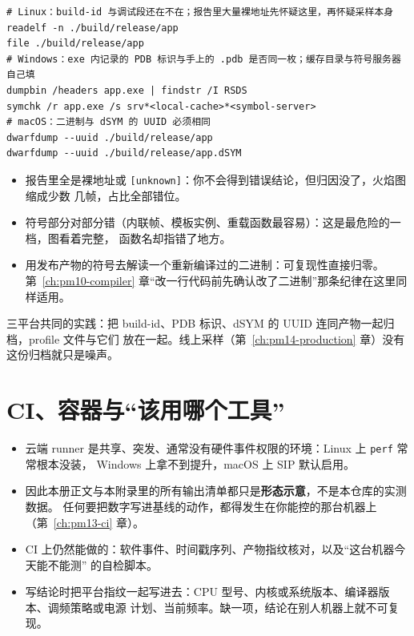 \documentclass[12pt,a4paper,fontset=fandol]{ctexbook}
\newcommand{\Tp}[1]{\texttt{#1}}
\begin{document}
\begin{lstlisting}[style=shellstyle, caption={三平台的产物与符号一致性核对}, label={lst:pmapA-symbol}]
# Linux：build-id 与调试段还在不在；报告里大量裸地址先怀疑这里，再怀疑采样本身
readelf -n ./build/release/app
file ./build/release/app
# Windows：exe 内记录的 PDB 标识与手上的 .pdb 是否同一枚；缓存目录与符号服务器自己填
dumpbin /headers app.exe | findstr /I RSDS
symchk /r app.exe /s srv*<local-cache>*<symbol-server>
# macOS：二进制与 dSYM 的 UUID 必须相同
dwarfdump --uuid ./build/release/app
dwarfdump --uuid ./build/release/app.dSYM
\end{lstlisting}

\begin{note}[title={符号丢了会怎样：三种不同的``看起来还好''}]
\begin{itemize}
  \item 报告里全是裸地址或 \Tp{[unknown]}：你不会得到错误结论，但归因没了，火焰图缩成少数
        几帧，占比全部错位。
  \item 符号部分对部分错（内联帧、模板实例、重载函数最容易）：这是最危险的一档，图看着完整，
        函数名却指错了地方。
  \item 用发布产物的符号去解读一个重新编译过的二进制：可复现性直接归零。
        第~\ref{ch:pm10-compiler} 章``改一行代码前先确认改了二进制''那条纪律在这里同样适用。
\end{itemize}
\end{note}

三平台共同的实践：把 build-id、PDB 标识、dSYM 的 UUID 连同产物一起归档，profile 文件与它们
放在一起。线上采样（第~\ref{ch:pm14-production} 章）没有这份归档就只是噪声。

\section{CI、容器与``该用哪个工具''}

\begin{bestpractice}[title={三平台 runner 的通用事实：先划边界，再定基线}]
\begin{itemize}
  \item 云端 runner 是共享、突发、通常没有硬件事件权限的环境：Linux 上 \Tp{perf} 常常根本没装，
        Windows 上拿不到提升，macOS 上 SIP 默认启用。
  \item 因此本册正文与本附录里的所有输出清单都只是\textbf{形态示意}，不是本仓库的实测数据。
        任何要把数字写进基线的动作，都得发生在你能控的那台机器上（第~\ref{ch:pm13-ci} 章）。
  \item CI 上仍然能做的：软件事件、时间戳序列、产物指纹核对，以及``这台机器今天能不能测''
        的自检脚本。
  \item 写结论时把平台指纹一起写进去：CPU 型号、内核或系统版本、编译器版本、调频策略或电源
        计划、当前频率。缺一项，结论在别人机器上就不可复现。
\end{itemize}
\end{bestpractice}
\end{document}
